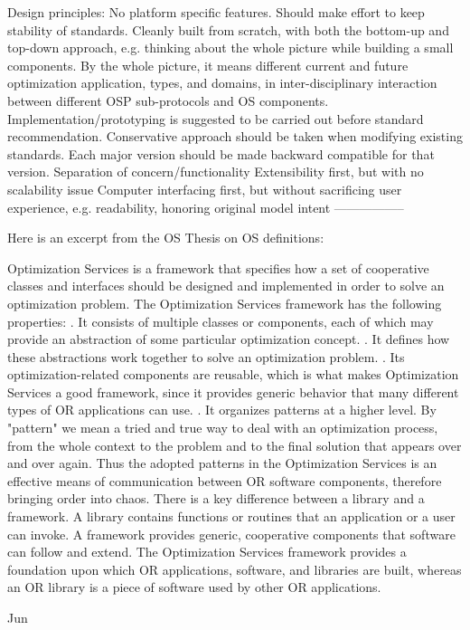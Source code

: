 Design principles:
No platform specific features.
Should make effort to keep stability of standards.
Cleanly built from scratch, with both the bottom-up and top-down approach, e.g. thinking about the whole picture while building a small components.
By the whole picture, it means different current and future optimization application, types, and domains, in inter-disciplinary interaction between different OSP sub-protocols and OS components.
Implementation/prototyping is suggested to be carried out before standard recommendation.
Conservative approach should be taken when modifying existing standards. Each major version should be made backward compatible for that version.
Separation of concern/functionality
Extensibility first, but with no scalability issue
Computer interfacing first, but without sacrificing user experience, e.g. readability, honoring original model intent
-----------------

Here is an excerpt from the OS Thesis on OS definitions:

Optimization Services is a framework that specifies how a set of cooperative classes and interfaces
should be designed and implemented in order to solve an optimization problem. The Optimization Services
framework has the following properties:
. It consists of multiple classes or components, each of which may provide an abstraction of some
particular optimization concept.
. It defines how these abstractions work together to solve an optimization problem.
. Its optimization-related components are reusable, which is what makes Optimization Services a good
framework, since it provides generic behavior that many different types of OR applications can use.
. It organizes patterns at a higher level. By "pattern" we mean a tried and true way to deal with an
optimization process, from the whole context to the problem and to the final solution that appears over
and over again. Thus the adopted patterns in the Optimization Services is an effective means of
communication between OR software components, therefore bringing order into chaos.
There is a key difference between a library and a framework. A library contains functions or routines
that an application or a user can invoke. A framework provides generic, cooperative components that
software can follow and extend. The Optimization Services framework provides a foundation upon which OR applications, software, and libraries
are built, whereas an OR library is a piece of software used by other OR applications.



Jun




